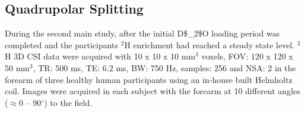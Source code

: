 


\subsection{Quadrupolar Splitting}

During the second main study, after the initial \ac{D$_2$O} loading period was completed and the participants $^2$H enrichment had reached a steady state level. $^2$H 3D \ac{CSI} data were acquired with 10 x 10 x 10 mm$^3$ voxels, \ac{FOV}: 120 x 120 x 50 mm$^3$, \ac{TR}: 500 ms, \ac{TE}: 6.2 ms, \ac{BW}: 750 Hz, samples: 256 and NSA: 2 in the forearm of three healthy human participants using an in-house built Helmholtz coil. Images were acquired in each subject with the forearm at 10 different angles ($\approx$0 – 90$^\circ$) to the field. 


